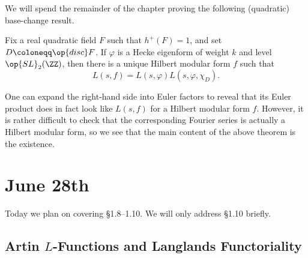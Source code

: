 \documentclass{article}
\begin{document}
We will spend the remainder of the chapter proving the following (quadratic) base-change result.
\begin{theorem}
	Fix a real quadratic field $F$ such that $h^+(F)=1$, and set $D\coloneqq\op{disc}F$. If $\varphi$ is a Hecke eigenform of weight $k$ and level $\op{SL}_2(\ZZ)$, then there is a unique Hilbert modular form $f$ such that
	\[L(s,f)=L(s,\varphi)L(s,\varphi,\chi_D).\]
\end{theorem}
\begin{remark}
	One can expand the right-hand side into Euler factors to reveal that its Euler product does in fact look like $L(s,f)$ for a Hilbert modular form $f$. However, it is rather difficult to check that the corresponding Fourier series is actually a Hilbert modular form, so we see that the main content of the above theorem is the existence.
\end{remark}

\section{June 28th}
Today we plan on covering \S1.8--1.10. We will only address \S1.10 briefly.

\subsection{Artin \texorpdfstring{$L$}{ L}-Functions and Langlands Functoriality}
\end{document}
